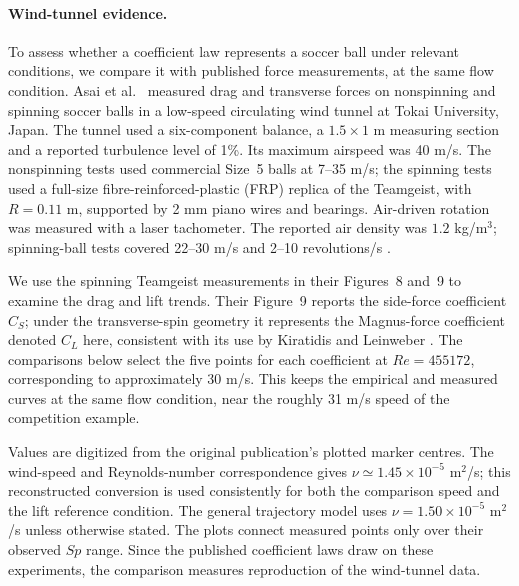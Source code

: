\documentclass[12pt,letterpaper]{article}
\begin{document}
\paragraph{Wind-tunnel evidence.}
To assess whether a coefficient law represents a soccer ball under relevant conditions, we compare it with published force measurements, at the same flow condition. Asai et al.\ \cite{asai2007} measured drag and transverse forces on nonspinning and spinning soccer balls in a low-speed circulating wind tunnel at Tokai University, Japan. The tunnel used a six-component balance, a $1.5\times1$ m measuring section and a reported turbulence level of 1\%. Its maximum airspeed was 40 m/s. The nonspinning tests used commercial Size~5 balls at 7--35 m/s; the spinning tests used a full-size fibre-reinforced-plastic (FRP) replica of the Teamgeist, with $R=0.11$ m, supported by 2 mm piano wires and bearings. Air-driven rotation was measured with a laser tachometer. The reported air density was $1.2$ kg/m$^3$; spinning-ball tests covered 22--30 m/s and 2--10 revolutions/s \cite{asai2007}.

We use the spinning Teamgeist measurements in their Figures~8 and~9 to examine the drag and lift trends. Their Figure~9 reports the side-force coefficient $C_S$; under the transverse-spin geometry it represents the Magnus-force coefficient denoted $C_L$ here, consistent with its use by Kiratidis and Leinweber \cite{asai2007,kiratidis2018}. The comparisons below select the five points for each coefficient at $Re=455172$, corresponding to approximately 30 m/s. This keeps the empirical and measured curves at the same flow condition, near the roughly 31 m/s speed of the competition example.

Values are digitized from the original publication's plotted marker centres. The wind-speed and Reynolds-number correspondence gives $\nu\simeq1.45\times10^{-5}$ m$^2$/s; this reconstructed conversion is used consistently for both the comparison speed and the lift reference condition. The general trajectory model uses $\nu=1.50\times10^{-5}$ m$^2$/s unless otherwise stated. The plots connect measured points only over their observed $Sp$ range. Since the published coefficient laws draw on these experiments, the comparison measures reproduction of the wind-tunnel data.
\end{document}
